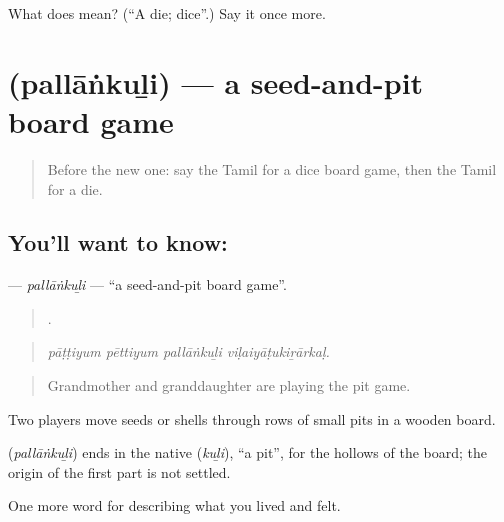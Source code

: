 \begin{tcolorbox}[breakable,colback=teal!4,colframe=teal!35!black,title={Before you move on}]
What does  mean? (\textquotedblleft{}A die; dice\textquotedblright{}.) Say it once more.
\end{tcolorbox}
\section[\texorpdfstring{\ta{பல்லாங்குழி} (pallāṅkuḻi)}{பல்லாங்குழி (pallāṅkuḻi)}]{ (pallāṅkuḻi) — a seed-and-pit board game}

\label{lesson:TA-C529-pallankuli}



\begin{quote}
Before the new one: say the Tamil for a dice board game, then the Tamil for a die.
\end{quote}

\subsection*{You'll want to know: }
\textbf{} — \emph{pallāṅkuḻi} — \textquotedblleft{}a seed-and-pit board game\textquotedblright{}.

\begin{quote}
   .
\end{quote}

\begin{quote}
\emph{pāṭṭiyum pēttiyum pallāṅkuḻi viḷaiyāṭukiṟārkaḷ.}
\end{quote}

\begin{quote}
Grandmother and granddaughter are playing the pit game.
\end{quote}

Two players move seeds or shells through rows of small pits in a wooden board.

\begin{cousinweb}
\textbf{} (\emph{pallāṅkuḻi}) ends in the native  (\emph{kuḻi}), \textquotedblleft{}a pit\textquotedblright{}, for the hollows of the board; the origin of the first part is not settled.
\end{cousinweb}

\begin{grammarlens}[title={What you've built}]
One more word for describing what you lived and felt.
\end{grammarlens}

